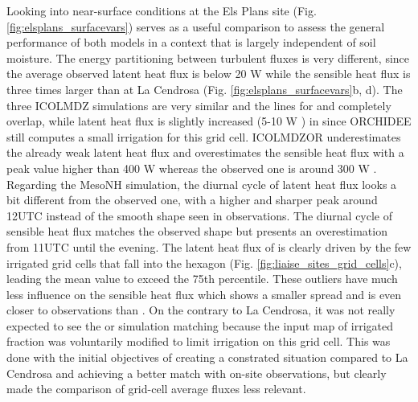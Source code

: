 Looking into near-surface conditions at the Els Plans site (Fig. \ref{fig:elsplans_surfacevars}) serves as a useful comparison to assess the general performance of both models in a context that is largely independent of soil moisture.
The energy partitioning between turbulent fluxes is very different, since the average observed latent heat flux is below 20 W \persqm while the sensible heat flux is three times larger than at La Cendrosa (Fig. \ref{fig:elsplans_surfacevars}b, d). 
The three ICOLMDZ simulations are very similar and the lines for \noirr and \irr completely overlap, while latent heat flux is slightly increased (5-10 W \persqm) in \irrboost since ORCHIDEE still computes a small irrigation for this grid cell. 
ICOLMDZOR underestimates the already weak latent heat flux and overestimates the sensible heat flux with a peak value higher than 400 W \persqm whereas the observed one is around 300 W \persqm. 
Regarding the MesoNH simulation, the \mesoexact diurnal cycle of latent heat flux looks a bit different from the observed one, with a higher and sharper peak around 12UTC instead of the smooth shape seen in observations. The diurnal cycle of sensible heat flux matches the observed shape but presents an overestimation from 11UTC until the evening.
The latent heat flux of \mesomean is clearly driven by the few irrigated grid cells that fall into the hexagon (Fig. \ref{fig:liaise_sites_grid_cells}c), leading the mean value to exceed the 75th percentile. These outliers have much less influence on the sensible heat flux which shows a smaller spread and is even closer to observations than \mesoexact.
On the contrary to La Cendrosa, it was not really expected to see the \irr or \irrboost simulation matching \mesomean because the input map of irrigated fraction was voluntarily modified to limit irrigation on this grid cell. This was done with the initial objectives of creating a constrated situation compared to La Cendrosa and achieving a better match with on-site observations, but clearly made the comparison of grid-cell average fluxes less relevant.

